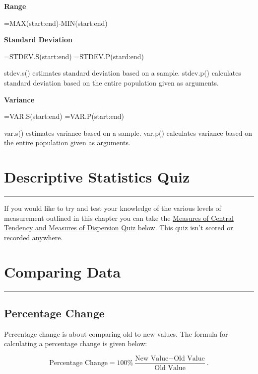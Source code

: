 \documentclass[
]{book}
\begin{document}
\textbf{Range}

=MAX(start:end)-MIN(start:end)

\textbf{Standard Deviation}

=STDEV.S(start:end)
=STDEV.P(stard:end)

stdev.s() estimates standard deviation based on a sample. stdev.p() calculates standard deviation based on the entire population given as arguments.

\textbf{Variance}

=VAR.S(start:end)
=VAR.P(start:end)

var.s() estimates variance based on a sample. var.p() calculates variance based on the entire population given as arguments.

\hypertarget{descriptive-statistics-quiz}{%
\chapter{Descriptive Statistics Quiz}\label{descriptive-statistics-quiz}}

\begin{center}\rule{0.5\linewidth}{0.5pt}\end{center}

If you would like to try and test your knowledge of the various levels of measurement outlined in this chapter you can take the \href{https://view.genial.ly/628a683cb8b7d200114d12a0/presentation-quiz-on-measures}{Measures of Central Tendency and Measures of Dispersion Quiz} below. This quiz isn't scored or recorded anywhere.

\hypertarget{comparing-data}{%
\chapter{Comparing Data}\label{comparing-data}}

\begin{center}\rule{0.5\linewidth}{0.5pt}\end{center}

\hypertarget{percentage-change}{%
\section{Percentage Change}\label{percentage-change}}

Percentage change is about comparing old to new values. The formula for calculating a percentage change is given below:

\[ \textrm{Percentage Change} = 100\% \frac{\textrm{New Value} - \textrm{Old Value}}{\textrm{Old Value}}.\]
\end{document}

